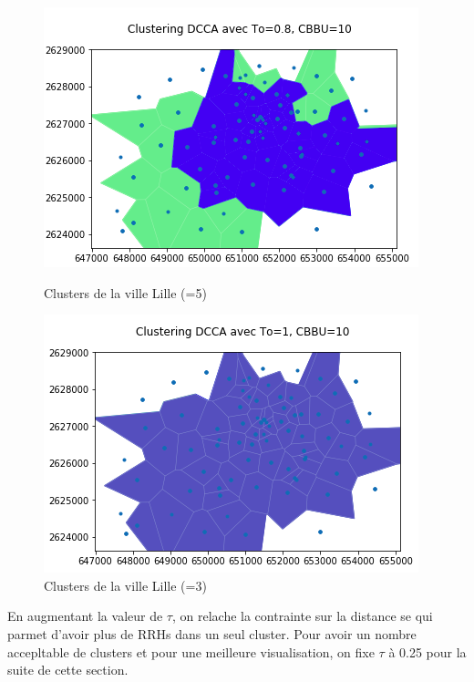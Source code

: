 \documentclass{report}
\begin{document}
\begin{figure}[H]
  \begin{minipage}{0.4\textwidth}
    \centering
    \includegraphics[scale=0.55]{images/To08.png}
    \caption{Clusters de la ville Lille (=5)}\label{Fig:Data1}
  \end{minipage}\hfill
  \begin{minipage}{0.4\textwidth}
    \centering
    \includegraphics[scale=0.55]{images/To1.png}
    \caption{Clusters de la ville Lille (=3)}\label{Fig:Data2}
  \end{minipage}
\end{figure}


En augmentant la valeur de $\tau$, on relache la contrainte sur la distance se qui parmet d'avoir plus de RRHs dans un seul cluster. 
Pour avoir un nombre accepltable de clusters et pour une meilleure visualisation, on fixe $\tau$ à 0.25 pour la suite de cette section.\\
\end{document}
